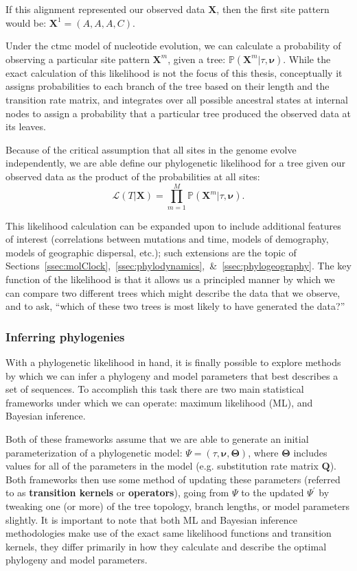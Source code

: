 If this alignment represented our observed data $\mathbf{X}$, then the first site pattern would be: $\mathbf{X}^1 = (A, A, A, C)$.

Under the \gls{ctmc} model of nucleotide evolution, we can calculate a probability of observing a particular site pattern $\mathbf{X}^m$, given a tree: $\mathbb{P}(\mathbf{X}^m | \tau, \mathbf{\nu})$.
While the exact calculation of this likelihood is not the focus of this thesis, conceptually it assigns probabilities to each branch of the tree based on their length and the transition rate matrix, and integrates over all possible ancestral states at internal nodes to assign a probability that a particular tree produced the observed data at its leaves.

Because of the critical assumption that all sites in the genome evolve independently, we are able define our phylogenetic likelihood for a tree given our observed data as the product of the probabilities at all sites:
\begin{equation}\label{eq:likelihood}
  \mathcal{L}(T | \mathbf{X}) = \prod_{m=1}^M \mathbb{P}(\mathbf{X}^m | \tau, \mathbf{\nu}). 
\end{equation}

This likelihood calculation can be expanded upon to include additional features of interest (correlations between mutations and time, models of demography, models of geographic dispersal, etc.); such extensions are the topic of Sections~\ref{ssec:molClock},~\ref{ssec:phylodynamics},~\&~\ref{ssec:phylogeography}.
The key function of the likelihood is that it allows us a principled manner by which we can compare two different trees which might describe the data that we observe, and to ask, ``which of these two trees is most likely to have generated the data?''

\subsubsection{Inferring phylogenies}
With a phylogenetic likelihood in hand, it is finally possible to explore methods by which we can infer a phylogeny and model parameters that best describes a set of sequences.
To accomplish this task there are two main statistical frameworks under which we can operate: maximum likelihood (ML), and Bayesian inference.

Both of these frameworks assume that we are able to generate an initial parameterization of a phylogenetic model: $\Psi = (\tau, \mathbf{\nu}, \mathbf{\Theta})$, where $\mathbf{\Theta}$ includes values for all of the parameters in the model (e.g. substitution rate matrix $\mathbf{Q}$).
Both frameworks then use some method of updating these parameters (referred to as \textbf{transition kernels} or \textbf{operators}), going from $\Psi$ to the updated $\Psi^{\prime}$ by tweaking one (or more) of the tree topology, branch lengths, or model parameters slightly.
It is important to note that both ML and Bayesian inference methodologies make use of the exact same likelihood functions and transition kernels, they differ primarily in how they calculate and describe the optimal phylogeny and model parameters.

